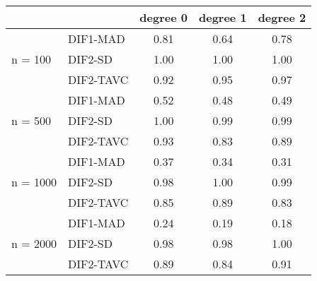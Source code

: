 \begin{tabular}{|l|l|c|c|c|}
  \hline
 &  & degree 0 & degree 1 & degree 2 \\ 
  \hline
 & DIF1-MAD & 0.81 & 0.64 & 0.78 \\ 
  n = 100 & DIF2-SD & 1.00 & 1.00 & 1.00 \\ 
   & DIF2-TAVC & 0.92 & 0.95 & 0.97 \\ 
   & DIF1-MAD & 0.52 & 0.48 & 0.49 \\ 
  n = 500 & DIF2-SD & 1.00 & 0.99 & 0.99 \\ 
   & DIF2-TAVC & 0.93 & 0.83 & 0.89 \\ 
   & DIF1-MAD & 0.37 & 0.34 & 0.31 \\ 
  n = 1000 & DIF2-SD & 0.98 & 1.00 & 0.99 \\ 
   & DIF2-TAVC & 0.85 & 0.89 & 0.83 \\ 
   & DIF1-MAD & 0.24 & 0.19 & 0.18 \\ 
  n = 2000 & DIF2-SD & 0.98 & 0.98 & 1.00 \\ 
   & DIF2-TAVC & 0.89 & 0.84 & 0.91 \\ 
   \hline
\end{tabular}
